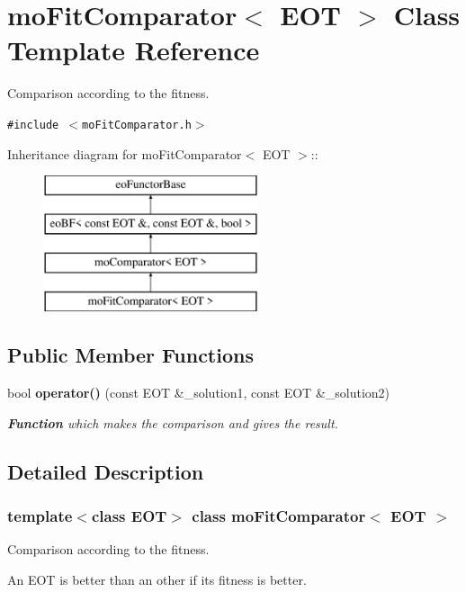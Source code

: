 \section{moFitComparator$<$ EOT $>$ Class Template Reference}
\label{classmo_fit_comparator}
Comparison according to the fitness.  


{\tt \#include $<$moFitComparator.h$>$}

Inheritance diagram for moFitComparator$<$ EOT $>$::\begin{figure}[H]
\begin{center}
\leavevmode
\includegraphics[height=4cm]{classmo_fit_comparator}
\end{center}
\end{figure}
\subsection*{Public Member Functions}
\begin{CompactItemize}
\item 
bool {\bf operator()} (const EOT \&\_\-solution1, const EOT \&\_\-solution2)
\begin{CompactList}\small\item\em {\bf Function} which makes the comparison and gives the result. \item\end{CompactList}\end{CompactItemize}


\subsection{Detailed Description}
\subsubsection*{template$<$class EOT$>$ class moFitComparator$<$ EOT $>$}

Comparison according to the fitness. 

An EOT is better than an other if its fitness is better. 



